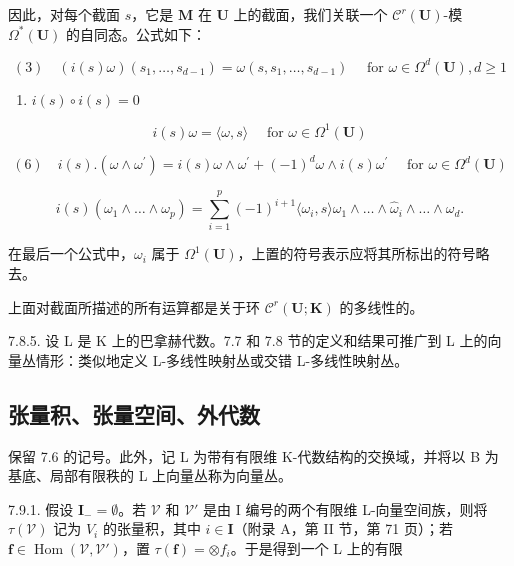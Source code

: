 因此，对每个截面 \(s\)，它是 \(\mathbf{M}\) 在 \(\mathbf{U}\) 上的截面，我们关联一个 \(\mathcal{C}^r (\mathbf{U})\)-模 \(\Omega^{*}(\mathbf{U})\) 的自同态。公式如下：

\[
(3) \quad (i (s) \omega) (s _ {1}, \dots , s _ {d - 1}) = \omega (s, s _ {1}, \dots , s _ {d - 1}) \quad \text { for } \omega \in \Omega^ {d} (\mathbf {U}), d \geqslant 1
\]

\begin{enumerate}
\def\labelenumi{(\arabic{enumi})}
\setcounter{enumi}{3}
\tightlist
\item
  \(i(s)\circ i(s) = 0\)
\end{enumerate}

\[
i (s) \omega = \langle \omega , s \rangle \quad \text { for } \omega \in \Omega^ {1} (\mathbf {U}) \tag {5}
\]

\[
(6) \quad i (s). (\omega \wedge \omega^ {\prime}) = i (s) \omega \wedge \omega^ {\prime} + (- 1) ^ {d} \omega \wedge i (s) \omega^ {\prime} \quad \text { for } \omega \in \Omega^ {d} (\mathbf {U})
\]

\[
i (s) (\omega_ {1} \wedge \dots \wedge \omega_ {p}) = \sum_ {i = 1} ^ {p} (- 1) ^ {i + 1} \langle \omega_ {i}, s \rangle \omega_ {1} \wedge \dots \wedge \hat {\omega} _ {i} \wedge \dots \wedge \omega_ {d}.\tag{7}
\]

在最后一个公式中，\(\omega_{i}\) 属于 \(\Omega^{1}(\mathbf{U})\)，上置的符号表示应将其所标出的符号略去。

上面对截面所描述的所有运算都是关于环 \(\mathcal{C}^r (\mathbf{U};\mathbf{K})\) 的多线性的。

7.8.5. 设 L 是 K 上的巴拿赫代数。7.7 和 7.8 节的定义和结果可推广到 L 上的向量丛情形：类似地定义 L-多线性映射丛或交错 L-多线性映射丛。

\subsection{张量积、张量空间、外代数}

保留 7.6 的记号。此外，记 L 为带有有限维 K-代数结构的交换域，并将以 B 为基底、局部有限秩的 L 上向量丛称为向量丛。

7.9.1. 假设 \(\mathbf{I}_{-} = \emptyset\)。若 \(\mathcal{V}\) 和 \(\mathcal{V}'\) 是由 I 编号的两个有限维 L-向量空间族，则将 \(\tau(\mathcal{V})\) 记为 \(V_{i}\) 的张量积，其中 \(i \in \mathbf{I}\)（附录 A，第 II 节，第 71 页）；若 \(\mathbf{f} \in \operatorname{Hom}(\mathcal{V}, \mathcal{V}')\)，置 \(\tau(\mathbf{f}) = \otimes f_{i}\)。于是得到一个 L 上的有限

